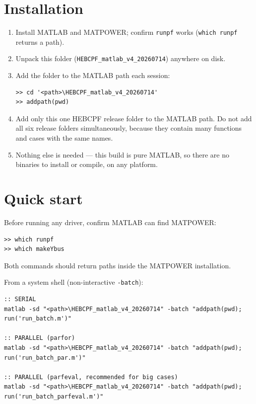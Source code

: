 \documentclass[11pt,a4paper]{article}
\newcommand{\code}[1]{\texttt{#1}}
\begin{document}
\section{Installation}

\begin{enumerate}[leftmargin=1.6em]
  \item Install MATLAB and MATPOWER; confirm \code{runpf} works
        (\code{which runpf} returns a path).
  \item Unpack this folder (\code{HEBCPF_matlab_v4_20260714}) anywhere on disk.
  \item Add the folder to the MATLAB path each session:
\begin{lstlisting}
>> cd '<path>\HEBCPF_matlab_v4_20260714'
>> addpath(pwd)
\end{lstlisting}
  \item Add only this one HEBCPF release folder to the MATLAB path. Do not add all six
        release folders simultaneously, because they contain many functions and cases with
        the same names.
  \item Nothing else is needed --- this build is pure MATLAB, so there are no binaries to
        install or compile, on any platform.
\end{enumerate}

\section{Quick start}

Before running any driver, confirm MATLAB can find MATPOWER:
\begin{lstlisting}[style=mat]
>> which runpf
>> which makeYbus
\end{lstlisting}
Both commands should return paths inside the MATPOWER installation.

From a system shell (non-interactive \code{-batch}):
\begin{lstlisting}[style=sh]
:: SERIAL
matlab -sd "<path>\HEBCPF_matlab_v4_20260714" -batch "addpath(pwd); run('run_batch.m')"

:: PARALLEL (parfor)
matlab -sd "<path>\HEBCPF_matlab_v4_20260714" -batch "addpath(pwd); run('run_batch_par.m')"

:: PARALLEL (parfeval, recommended for big cases)
matlab -sd "<path>\HEBCPF_matlab_v4_20260714" -batch "addpath(pwd); run('run_batch_parfeval.m')"
\end{lstlisting}
\end{document}
